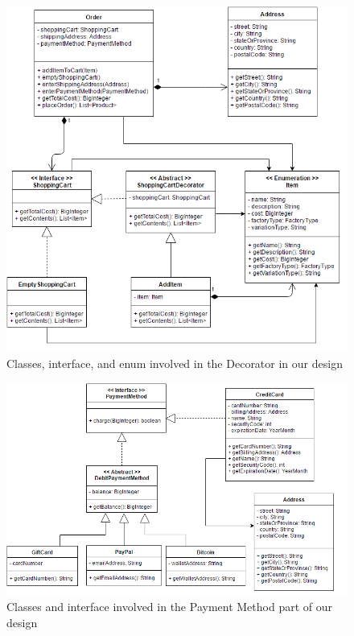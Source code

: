 \documentclass[letter paper, 12pt]{article}
\newcommand{\noin}{\noindent}
\begin{document}
\begin{figure}[h]
	\caption{Classes, interface, and enum involved in the Decorator in our design}
	\noin\includegraphics{DecoratorUML}
\end{figure}
\newpage
\begin{figure}[h]
	\caption{Classes and interface involved in the Payment Method part of our design}
	\noin\includegraphics[scale=0.9]{PaymentUML}
\end{figure}
\end{document}
